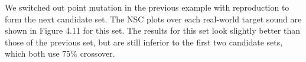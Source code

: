 \documentclass[a4paper,12pt]{report} 	%
\numberwithin{figure}{chapter}
\numberwithin{table}{chapter}
\numberwithin{equation}{chapter}
\begin{document}
\begin{flushleft}
We switched out point mutation in the previous example with reproduction to form the next candidate set. The NSC plots over each real-world target sound are shown in Figure 4.11 for this set.
The results for this set look slightly better than those of the previous set, but are still inferior to the first two candidate sets, which both use $75\%$ crossover.


\end{flushleft}
\end{document}
